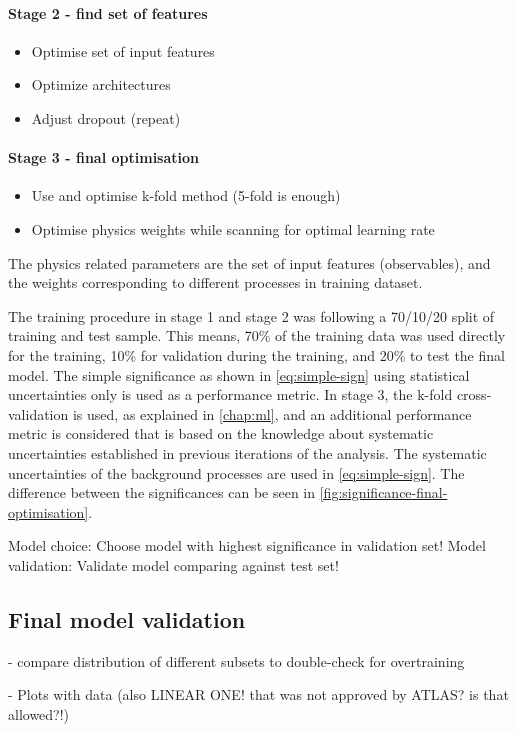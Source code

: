 \paragraph{Stage 2 - find set of features}
\begin{itemize}
    \item Optimise set of input features
    \item Optimize architectures
    \item Adjust dropout (repeat)
\end{itemize}

\paragraph{Stage 3 - final optimisation}
\begin{itemize}
    \item Use and optimise k-fold method (5-fold is enough)
    \item Optimise physics weights while scanning for optimal learning rate
\end{itemize}

The physics related parameters are the set of input features (observables), and the weights corresponding to different processes in training dataset. 

The training procedure in stage 1 and stage 2 was following a 70/10/20 split of training and test sample. This means, 70\% of the training data was used directly for the training, 10\% for validation during the training, and 20\% to test the final model. The simple significance as shown in \cref{eq:simple-sign} using statistical uncertainties only is used as a performance metric.
In stage 3, the k-fold cross-validation is used, as explained in \cref{chap:ml}, and an additional performance metric is considered that is based on the knowledge about systematic uncertainties established in previous iterations of the analysis. The systematic uncertainties of the background processes are used in \cref{eq:simple-sign}. The difference between the significances can be seen in \cref{fig:significance-final-optimisation}.

Model choice: Choose model with highest significance in validation set!
Model validation: Validate model comparing against test set!




\subsection{Final model validation}

- compare distribution of different subsets to double-check for overtraining

- Plots with data (also LINEAR ONE! that was not approved by ATLAS? is that allowed?!)


